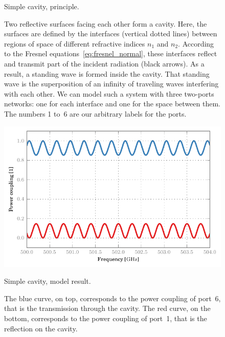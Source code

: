 \begin{figure}[hbtp]
    \centering
    
    \caption{Simple cavity, principle.}
    \caption*{
        Two reflective surfaces facing each other form a cavity.
        Here, the surfaces are defined by the interfaces (vertical dotted lines)
        between regions of space of different refractive indices $n_1$ and $n_2$.
        According to the Fresnel equations~\eqref{eq:fresnel_normal}, these interfaces
        reflect and transmit part of the incident radiation (black arrows).
        As a result, a standing wave is formed inside the cavity.
        That standing wave is the superposition of an infinity of traveling waves
        interfering with each other.
        We can model such a system with three two-ports networks:
        one for each interface and one for the space between them.
        The numbers 1 to~6 are our arbitrary labels for the ports.
    }
    \label{fig:simple_cavity_principle}
\end{figure}
\begin{figure}[hbtp]
    \centering
    \includegraphics{simple_cavity_direct}
    \caption{Simple cavity, model result.}
    \caption*{
        The blue curve, on top, corresponds to the power coupling of port~6,
        that is the transmission through the cavity.
        The red curve, on the bottom, corresponds to the power coupling of port~1,
        that is the reflection on the cavity.
    }
    \label{fig:simple_cavity_direct}
\end{figure}
